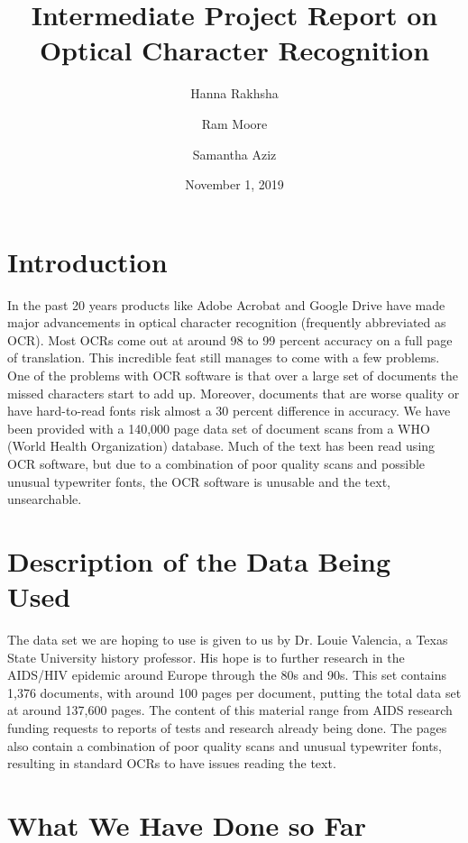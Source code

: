 \documentclass{article}
\title{Intermediate Project Report on Optical Character Recognition}
\author{Hanna Rakhsha \and Ram Moore \and Samantha Aziz}
\date{November 1, 2019}
\begin{document}
\maketitle

\section{Introduction}
In the past 20 years products like Adobe Acrobat and Google Drive have made major advancements in optical character recognition (frequently abbreviated as OCR).
Most OCRs come out at around 98 to 99 percent accuracy on a full page of translation. \cite{Council}
This incredible feat still manages to come with a few problems.
One of the problems with OCR software is that over a large set of documents the missed characters start to add up.
Moreover, documents that are worse quality or have hard-to-read fonts risk almost a 30 percent difference in accuracy. \cite{Holley} \newline
We have been provided with a 140,000 page data set of document scans from a WHO (World Health Organization) database.
Much of the text has been read using OCR software, but due to a combination of poor quality scans and possible unusual typewriter fonts, the OCR software is unusable and the text, unsearchable.

\section{Description of the Data Being Used}
The data set we are hoping to use is given to us by Dr. Louie Valencia, a Texas State University history professor.
His hope is to further research in the AIDS/HIV epidemic around Europe through the 80s and 90s.
This set contains 1,376 documents, with around 100 pages per document, putting the total data set at around 137,600 pages.
The content of this material range from AIDS research funding requests to reports of tests and research already being done.
The pages also contain a combination of poor quality scans and unusual typewriter fonts, resulting in standard OCRs to have issues reading the text.


\section{What We Have Done so Far}
\end{document}
